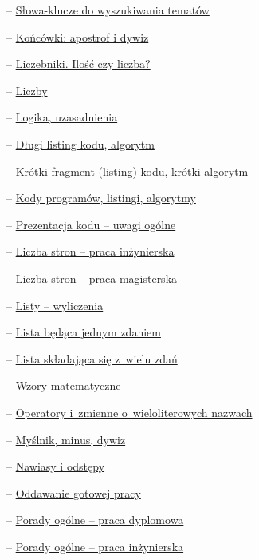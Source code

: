 \begin{description}
  \item{} -- \hyperref[sec:dod:klucze]{Słowa-klucze do wyszukiwania tematów}
  \item{} -- \hyperref[sec:dod:apostrof-dywiz]{Końcówki: apostrof i dywiz}
  \item{} -- \hyperref[sec:dod:liczebniki]{Liczebniki. Ilość czy liczba?}
  \item{} -- \hyperref[sec:dod:liczby]{Liczby}
  \item{} -- \hyperref[sec:dod:logika-uzasadnienia]{Logika, uzasadnienia}
  \item{} -- \hyperref[sec:dod:listing-dlugi]{Długi listing kodu, algorytm}
  \item{} -- \hyperref[sec:dod:listing-krotki]{Krótki fragment (listing) kodu, krótki algorytm}
  \item{} -- \hyperref[sec:dod:listing]{Kody programów, listingi, algorytmy}
  \item{} -- \hyperref[sec:dod:listing-uwagi-ogolne]{Prezentacja kodu -- uwagi ogólne}
  \item{} -- \hyperref[sec:dod:liczba-stron-inzynierskiej]{Liczba stron -- praca inżynierska}
  \item{} -- \hyperref[sec:dod:liczba-stron-magisterskiej]{Liczba stron -- praca magisterska}
  \item{} -- \hyperref[sec:dod:listy]{Listy -- wyliczenia}
  \item{} -- \hyperref[sec:dod:lista-jedno-zdanie]{Lista będąca jednym zdaniem}
  \item{} -- \hyperref[sec:dod:lista-wiele-zdan]{Lista składająca się z~wielu zdań}
  \item{} -- \hyperref[sec:dod:wzorymat]{Wzory matematyczne}
  \item{} -- \hyperref[sec:dod:operatory]{Operatory i~zmienne o~wieloliterowych nazwach}
  \item{} -- \hyperref[sec:dod:myslnik-minus-dywiz]{Myślnik, minus, dywiz}
  \item{} -- \hyperref[sec:dod:nawiasy]{Nawiasy i odstępy}
  \item{} -- \hyperref[sec:dod:oddawanie]{Oddawanie gotowej pracy}
  \item{} -- \hyperref[sec:dod:ogolne-praca-dyplomowa]{Porady ogólne -- praca dyplomowa}
  \item{} -- \hyperref[sec:dod:ogolne-praca-inzynierska]{Porady ogólne -- praca inżynierska}

\end{description}
